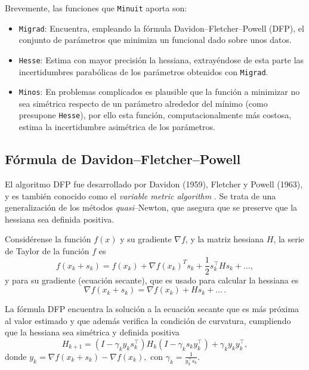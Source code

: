 Brevemente, las funciones que \texttt{Minuit} aporta son:
\begin{itemize}
  \item \texttt{Migrad}: Encuentra, empleando la fórmula Davidon–Fletcher–Powell (DFP), el conjunto de parámetros que minimiza un funcional dado sobre unos datos.
  \item \texttt{Hesse}: Estima con mayor precisión la hessiana, extrayéndose de esta parte las incertidumbres parabólicas de los parámetros obtenidos con \texttt{Migrad}.   
  \item \texttt{Minos}: En problemas complicados es plausible que la función a minimizar no sea simétrica respecto de un parámetro alrededor del mínimo (como presupone \texttt{Hesse}), por ello esta función, computacionalmente más costosa, estima la incertidumbre asimétrica de los parámetros.
\end{itemize}



\subsection{Fórmula de Davidon–Fletcher–Powell}

El algoritmo DFP fue desarrollado por Davidon (1959), Fletcher y Powell (1963), y es también conocido como el \emph{variable metric algorithm} \cite{fletcher1963rapidly}. Se trata de una generalización de los métodos \textit{quasi}--Newton, que asegura que se preserve que la hessiana sea definida positiva.

Considérense la función $f(x)$ y su gradiente $\nabla f$, y la matriz hessiana $H$, la serie de Taylor de la función $f$ es \cite{fletcher2000practical}
\begin{equation}
  f(x_k+s_k) = f(x_k) + \nabla f(x_k)^T s_k + \frac{1}{2} s_k^{\top} {H} s_k + \dots,
\end{equation}
y para su gradiente (ecuación secante), que es usado para calcular la hessiana es
\[\nabla f(x_k+s_k) = \nabla f(x_k) + H s_k + \dots\,.\]
  

La fórmula DFP encuentra la solución a la ecuación secante que es más próxima al valor estimado y que además verifica la condición de curvatura, cumpliendo que la hessiana sea simétrica y definida positiva
\begin{equation}
  H_{k+1}=
(I - \gamma_k y_k s_k^{\top}) H_k (I - \gamma_k s_k y_k^{\top}) + \gamma_k y_k y_k^{\top},
\end{equation}
donde $y_k = \nabla f(x_k+s_k) - \nabla f(x_k),$ con 
$\gamma_k = \frac{1}{y_k^{\top} s_k}$.

